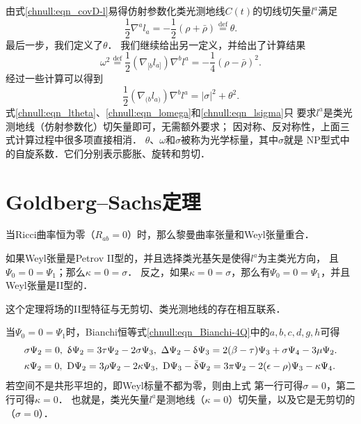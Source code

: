 由式\eqref{chnull:eqn_covD-l}易得仿射参数化类光测地线$C(t)$的切线切矢量$l^a$满足
\begin{equation}\label{chnull:eqn_ltheta}
    \frac{1}{2}\nabla^{a} l_a =-\frac{1}{2} (\rho +\bar{\rho})
    \overset{\mathrm {def}}{=} \theta .
\end{equation}
最后一步，我们定义了$\theta$．
我们继续给出另一定义，并给出了计算结果
\begin{equation}\label{chnull:eqn_lomega}
    \omega^2 \overset{\mathrm {def}}{=} \frac{1}{2} (\nabla_{[b} l_{a]}) \nabla^{b} l^{a}
    = -\frac{1}{4}  (\rho - \bar{\rho})^2 .
\end{equation}
经过一些计算可以得到
\begin{equation}\label{chnull:eqn_lsigma}
    \frac{1}{2} (\nabla_{(b} l_{a)}) \nabla^{b} l^{a}
    =|\sigma|^2 + \theta^2 .
\end{equation}
式\eqref{chnull:eqn_ltheta}、\eqref{chnull:eqn_lomega}和\eqref{chnull:eqn_lsigma}只
要求$l^a$是类光测地线（仿射参数化）切矢量即可，无需额外要求；
因对称、反对称性，上面三式计算过程中很多项直接相消．
$\theta$、$\omega$和$\sigma$被称为{\heiti 光学标量}，其中$\sigma$就是
NP型式中的自旋系数．它们分别表示膨胀、旋转和剪切．




\section{Goldberg--Sachs定理}
当Ricci曲率恒为零（$R_{ab}=0$）时，那么黎曼曲率张量和Weyl张量重合．

\begin{theorem}\label{chnull:thm_Goldenberg-Sachs}
    如果Weyl张量是Petrov II型的，并且选择类光基矢是使得$l^a$为主类光方向，
    且$\Psi_0=0=\Psi_1$；那么$\kappa=0=\sigma$．
    反之，如果$\kappa=0=\sigma$，那么有$\Psi_0=0=\Psi_1$，并且Weyl张量是II型的．
\end{theorem}

这个定理将场的II型特征与无剪切、类光测地线的存在相互联系．

当$\Psi_0=0=\Psi_1$时，Bianchi恒等式\eqref{chnull:eqn_Bianchi-4Q}中的$a,b,c,d,g,h$可得
    \begin{align*}
        &  \sigma \Psi _{2} =0, \
        \updelta \Psi_{2}  =   3\tau \Psi_{2} - 2\sigma \Psi _{3}, \
        \Delta \Psi_{2}-\updelta \Psi_{3}
        =2(\beta -\tau )  \Psi_{3}+\sigma \Psi_{4} -3\mu \Psi_{2}.  \\
        &  \kappa \Psi _{2} =0,       \
        {\rm D}\Psi _{2} = 3\rho \Psi _{2}-2\kappa \Psi _{3},\
        {\rm D}\Psi_{3}-\bar{\updelta }\Psi_{2}
        = 3\pi \Psi_{2} -2(\epsilon -\rho )\Psi_{3} -\kappa \Psi_{4} .
    \end{align*}
若空间不是共形平坦的，即Weyl标量不都为零，则由上式
第一行可得$\sigma=0$，第二行可得$\kappa=0$．
也就是，类光矢量$l^a$是测地线（$\kappa=0$）切矢量，以及它是无剪切的（$\sigma=0$）．

